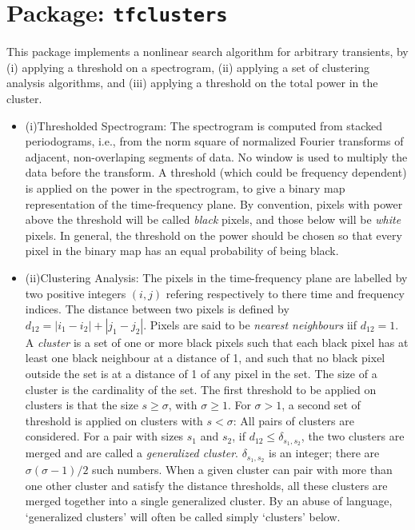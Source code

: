\chapter{Package: \texttt{tfclusters}}
     This package implements a nonlinear search algorithm for arbitrary transients, by (i) applying a threshold on a spectrogram, (ii) applying a set of clustering analysis algorithms, and (iii) applying a threshold on the total power in the cluster.

\begin{itemize}

\item{(i)Thresholded Spectrogram:} The spectrogram is computed from stacked periodograms, i.e., from the norm square of normalized Fourier transforms of adjacent, non-overlaping segments of data. No window is used to multiply the data before the transform. A threshold (which could be frequency dependent) is applied on the power in the spectrogram, to give a binary map representation of the time-frequency plane. By convention, pixels with power above the threshold will be called {\it black} pixels, and those below will be {\it white} pixels. In general, the threshold on the power should be chosen so that every pixel in the binary map has an equal probability of being black.
\item{(ii)Clustering Analysis:} The pixels in the time-frequency plane are labelled by two positive integers $(i,j)$ refering respectively to there time and frequency indices. The distance between two pixels is defined by $d_{12} = |i_1 - i_2| + |j_1 - j_2|$. Pixels are said to be {\it nearest neighbours} iif $d_{12} = 1$. A {\it cluster} is a set of one or more black pixels such that each black pixel has at least one black neighbour at a distance of 1, and such that no black pixel outside the set is at a distance of 1 of any pixel in the set. The size of a cluster is the cardinality of the set.
The first threshold to be applied on clusters is that the size $s \geq \sigma$, with $\sigma \geq 1$. 
For $\sigma > 1$, a second set of threshold is applied on clusters with $s < \sigma$: All pairs of clusters are considered. For a pair with sizes $s_1$ and $s_2$, if $d_{12} \leq \delta_{s_1,s_2}$, the two clusters are merged and are called a {\it generalized cluster}. $\delta_{s_1,s_2}$ is an integer; there are $\sigma(\sigma-1)/2$ such numbers. When a given cluster can pair with more than one other cluster and satisfy the distance thresholds, all these clusters are merged together into a single generalized cluster.
By an abuse of language, `generalized clusters' will often be called simply `clusters' below.

\end{itemize}
